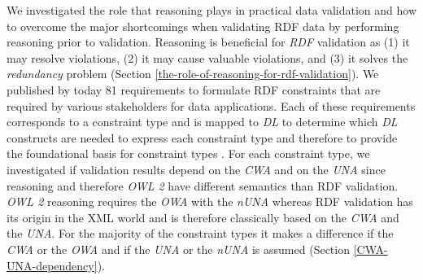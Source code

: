\documentclass{acm_proc_article-sp}
\begin{document}



We investigated the role that reasoning plays in practical data validation and 
how to overcome the major shortcomings when validating RDF data by performing reasoning prior to validation.
Reasoning is beneficial for \emph{RDF} validation as 
(1) it may resolve violations, 
(2) it may cause valuable violations, and 
(3) it solves the \emph{redundancy} problem (Section \ref{the-role-of-reasoning-for-rdf-validation}).
We published by today 81 requirements to formulate RDF constraints that are required by various stakeholders for data applications.
Each of these requirements corresponds to a constraint type and is mapped to \emph{DL}
to determine which \emph{DL} constructs are needed to express each constraint type
and therefore to provide the foundational basis for constraint types \cite{BoschNolleAcarEckert2015}.
For each constraint type, we investigated if validation results depend on the \emph{CWA} and on the \emph{UNA}
since reasoning and therefore \emph{OWL 2} have different semantics than RDF validation.
\emph{OWL 2} reasoning requires the \emph{OWA} with the \emph{nUNA} 
whereas RDF validation has its origin in the XML world and is therefore classically based on the \emph{CWA} and the \emph{UNA}.
For the majority of the constraint types it makes a difference if the \emph{CWA} or the \emph{OWA} and if the \emph{UNA} or the \emph{nUNA} is assumed (Section \ref{CWA-UNA-dependency}).
\end{document}
